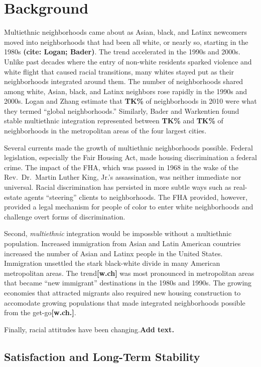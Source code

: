 \documentclass[]{article}
\theoremstyle{definition}
\theoremstyle{definition}
\theoremstyle{definition}
\theoremstyle{remark}
\begin{document}
\section{Background}\label{background}

Multiethnic neighborhoods came about as Asian, black, and Latinx
newcomers moved into neighborhoods that had been all white, or nearly
so, starting in the 1980s \textbf{(cite: Logan; Bader)}. The trend
accelerated in the 1990s and 2000s. Unlike past decades where the entry
of non-white residents sparked violence and white flight that caused
racial transitions, many whites stayed put as their neighborhoods
integrated around them. The number of neighborhoods shared among white,
Asian, black, and Latinx neighbors rose rapidly in the 1990s and 2000s.
Logan and Zhang estimate that \textbf{TK\%} of neighborhoods in 2010
were what they termed ``global neighborhoods.'' Similarly, Bader and
Warkentien found stable multiethnic integration represented between
\textbf{TK\%} and \textbf{TK\%} of neighborhoods in the metropolitan
areas of the four largest cities.

Several currents made the growth of multiethnic neighborhoods possible.
Federal legislation, especially the Fair Housing Act, made housing
discrimination a federal crime. The impact of the FHA, which was passed
in 1968 in the wake of the Rev.~Dr.~Martin Luther King, Jr.'s
assassination, was neither immediate nor universal. Racial
discrimination has persisted in more subtle ways such as real-estate
agents ``steering'' clients to neighborhoods. The FHA provided, however,
provided a legal mechanism for people of color to enter white
neighborhoods and challenge overt forms of discrimination.

Second, \emph{multiethnic} integration would be impossble without a
multiethnic population. Increased immigration from Asian and Latin
American countries increased the number of Asian and Latinx people in
the United States. Immigration unsettled the stark black-white divide in
many American metropolitan areas. The trend\textbf{{[}w.ch{]}} was most
pronounced in metropolitan areas that became ``new immigrant''
destinations in the 1980s and 1990s. The growing economies that
attracted migrants also required new housing construction to accomodate
growing populations that made integrated neighborhoods possible from the
get-go\textbf{{[}w.ch.{]}}.

Finally, racial attitudes have been changing.\textbf{Add text.}

\subsection{Satisfaction and Long-Term
Stability}\label{satisfaction-and-long-term-stability}
\end{document}
